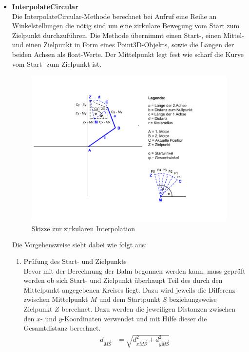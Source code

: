 \begin{itemize}
\item \textbf{InterpolateCircular}\\
Die InterpolateCircular-Methode berechnet bei Aufruf eine Reihe an Winkelstellungen die nötig sind um eine zirkulare Bewegung vom Start zum Zielpunkt durchzuführen. Die Methode übernimmt einen Start-, einen Mittel- und einen Zielpunkt in Form eines Point3D-Objekts, sowie die Längen der beiden Achsen als float-Werte. Der Mittelpunkt legt fest wie scharf die Kurve vom Start- zum Zielpunkt ist.\\
\begin{figure}[H]
  \centering
  \begin{minipage}[t]{12 cm}
  	\centering
  	\includegraphics[width=12cm]{images/Zirkularinterpolation} 
    \caption{Skizze zur zirkularen Interpolation}
  \end{minipage}
\end{figure}
Die Vorgehensweise sieht dabei wie folgt aus:
\begin{enumerate}
\item Prüfung des Start- und Zielpunkts\\
Bevor mit der Berechnung der Bahn begonnen werden kann, muss geprüft werden ob sich Start- und Zielpunkt überhaupt Teil des durch den Mittelpunkt angegebenen Kreises liegt. Dazu wird jeweils die Differenz zwischen Mittelpunkt $M$ und dem Startpunkt $S$ beziehungsweise Zielpunkt $Z$ berechnet. Dazu werden die jeweiligen Distanzen zwischen den $x$- und $y$-Koordinaten verwendet und mit Hilfe dieser die Gesamtdistanz berechnet.
\begin{align*}
d_{\overrightarrow{MS}} & = \sqrt{d_{x\overrightarrow{MS}}^2 + d_{y\overrightarrow{MS}}^2}\\

\end{align*}
\end{enumerate}
\end{itemize}

